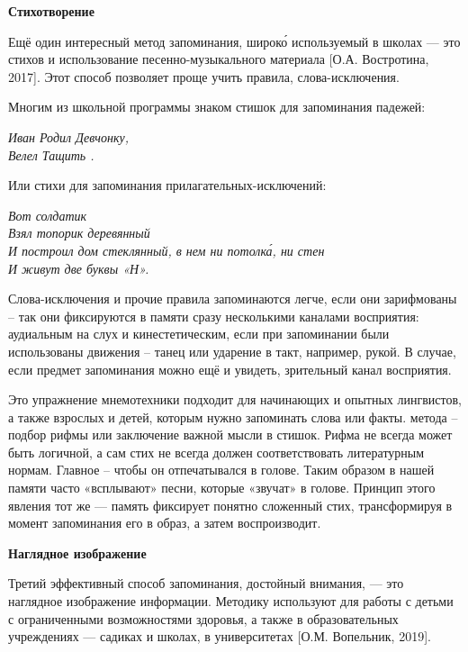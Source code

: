 \textbf{Стихотворение}

Ещё один интересный метод запоминания, широк\'{о} используемый в школах --- это  стихов и использование песенно-музыкального материала [О.А. Востротина, 2017]. Этот способ позволяет проще учить правила, слова-исключения.

Многим из школьной программы знаком стишок для запоминания падежей:

\begin{center}\it
    Иван Родил Девчонку,\\
    Велел Тащить .
\end{center}

Или стихи для запоминания прилагательных-исключений:

\begin{center}
    \it Вот солдатик \\
    Взял топорик деревянный\\
    И построил дом стеклянный, в нем ни потолк\'{а}, ни стен\\
    И живут две буквы «Н».
\end{center}

Слова-исключения и прочие правила запоминаются легче, если они зарифмованы – так они фиксируются в памяти сразу несколькими каналами восприятия: аудиальным на слух и кинестетическим, если при запоминании были использованы движения – танец или ударение в такт, например, рукой. В случае, если предмет запоминания можно ещё и увидеть,  зрительный канал восприятия.

Это упражнение мнемотехники подходит для начинающих и опытных лингвистов, а также взрослых и детей, которым нужно запоминать слова или факты.  метода – подбор рифмы или заключение важной мысли в стишок. Рифма не всегда может быть логичной, а сам стих не всегда должен соответствовать литературным нормам. Главное – чтобы он отпечатывался в голове. Таким образом в нашей памяти часто «всплывают» песни, которые   «звучат» в голове. Принцип этого явления тот же --- память фиксирует понятно сложенный стих, трансформируя в момент запоминания его в образ, а затем воспроизводит.

\textbf{Наглядное изображение}

Третий эффективный способ запоминания, достойный внимания, --- это наглядное изображение информации. Методику используют для работы с детьми с ограниченными возможностями здоровья, а также в образовательных учреждениях --- садиках и школах, в университетах [О.М. Вопельник, 2019].

